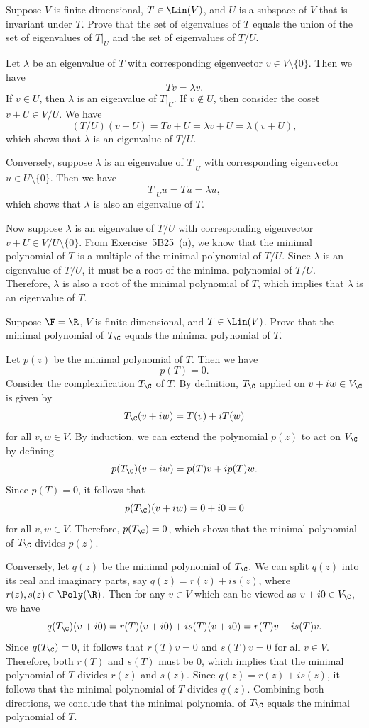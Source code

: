 \begin{exercise}
Suppose $V$ is finite-dimensional, $T\in\Lin(V)$, and $U$ is a subspace of $V$
that is invariant under $T$. Prove that the set of eigenvalues of $T$ equals
the union of the set of eigenvalues of $T|_U$ and the set of eigenvalues of
$T/U$.
\end{exercise}
\begin{solution}
Let $\lambda$ be an eigenvalue of $T$ with corresponding eigenvector
$v\in V\setminus\{0\}$. Then we have
\[ Tv=\lambda v. \]
If $v\in U$, then $\lambda$ is an eigenvalue of $T|_U$. If $v\notin U$, then
consider the coset $v+U\in V/U$. We have
\[ (T/U)(v+U)=Tv+U=\lambda v+U=\lambda(v+U), \]
which shows that $\lambda$ is an eigenvalue of $T/U$.

Conversely, suppose $\lambda$ is an eigenvalue of $T|_U$ with corresponding
eigenvector $u\in U\setminus\{0\}$. Then we have
\[ T|_Uu=Tu=\lambda u, \]
which shows that $\lambda$ is also an eigenvalue of $T$.

Now suppose $\lambda$ is an eigenvalue of $T/U$ with corresponding eigenvector
$v+U\in V/U\setminus\{0\}$. From Exercise~5B25~(a), we know that the minimal
polynomial of $T$ is a multiple of the minimal polynomial of $T/U$. Since
$\lambda$ is an eigenvalue of $T/U$, it must be a root of the minimal
polynomial of $T/U$. Therefore, $\lambda$ is also a root of the minimal
polynomial of $T$, which implies that $\lambda$ is an eigenvalue of $T$.
\end{solution}

\begin{exercise}
Suppose $\F=\R$, $V$ is finite-dimensional, and $T\in\Lin(V)$. Prove that the
minimal polynomial of $T_{\C}$ equals the minimal polynomial of $T$.
\end{exercise}
\begin{solution}
Let $p(z)$ be the minimal polynomial of $T$. Then we have
\[ p(T)=0. \]
Consider the complexification $T_{\C}$ of $T$. By definition, $T_{\C}$
applied on $v+iw\in V_{\C}$ is given by
\[ T_{\C}(v+iw)=T(v)+iT(w) \]
for all $v,w\in V$. By induction, we can extend the polynomial $p(z)$ to act
on $V_{\C}$ by defining
\[ p(T_{\C})(v+iw)=p(T)v+ip(T)w. \]
Since $p(T)=0$, it follows that
\[ p(T_{\C})(v+iw)=0+i0=0 \]
for all $v,w\in V$. Therefore, $p(T_{\C})=0$, which shows that the minimal
polynomial of $T_{\C}$ divides $p(z)$.

Conversely, let $q(z)$ be the minimal polynomial of $T_{\C}$. We can split
$q(z)$ into its real and imaginary parts, say $q(z)=r(z)+is(z)$, where
$r(z),s(z)\in\Poly(\R)$. Then for any $v\in V$ which can be viewed as
$v+i0\in V_{\C}$, we have
\[ q(T_{\C})(v+i0)=r(T)(v+i0)+is(T)(v+i0)=r(T)v+is(T)v. \]
Since $q(T_{\C})=0$, it follows that $r(T)v=0$ and $s(T)v=0$ for all $v\in V$.
Therefore, both $r(T)$ and $s(T)$ must be $0$, which implies that the minimal
polynomial of $T$ divides $r(z)$ and $s(z)$. Since $q(z)=r(z)+is(z)$, it
follows that the minimal polynomial of $T$ divides $q(z)$. Combining both
directions, we conclude that the minimal polynomial of $T_{\C}$ equals the
minimal polynomial of $T$.
\end{solution}

